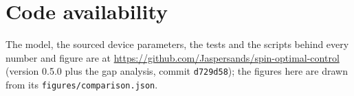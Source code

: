 \documentclass[reprint,aps,pra,floatfix,superscriptaddress,longbibliography,nofootinbib]{revtex4-2}
\begin{document}
\section*{Code availability}

The model, the sourced device parameters, the tests and the scripts behind every number and figure are at \url{https://github.com/Jaspersands/spin-optimal-control}~\cite{code} (version 0.5.0 plus the gap analysis, commit \texttt{d729d58}); the figures here are drawn from its \texttt{figures/comparison.json}.


\end{document}
